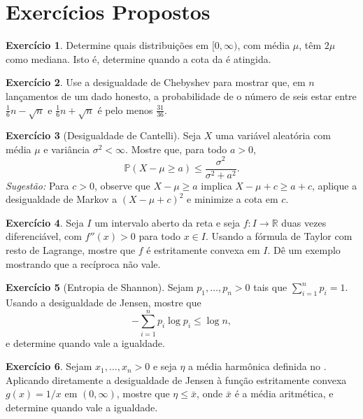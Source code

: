 \documentclass[12pt,portuguese]{article}
\theoremstyle{definition}
\theoremstyle{plainexercise}
\newtheorem{exercise}{Exercício}
\theoremstyle{starredexercise}
\newtheorem{starredexercise}[exercise]{Exercício}
\theoremstyle{definition}
\begin{document}
\section{Exercícios Propostos}\label{sec:exercicios}

\begin{exercise}\label{exercise:mediana-igualdade}
Determine quais distribuições em $[0,\infty)$, com média $\mu$, têm $2\mu$
como mediana. Isto é, determine quando a cota da
 é atingida.
\end{exercise}

\begin{exercise}\label{exercise:chebyshev-dado}
Use a desigualdade de Chebyshev para mostrar que, em $n$ lançamentos de um dado
honesto, a probabilidade de o número de seis estar entre
$\frac{1}{6}n-\sqrt n$ e $\frac{1}{6}n+\sqrt n$ é pelo menos $\frac{31}{36}$.
\end{exercise}

\begin{starredexercise}[Desigualdade de Cantelli]\label{exercise:chebyshev-forma}
Seja $X$ uma variável aleatória com média $\mu$ e variância $\sigma^2<\infty$.
Mostre que, para todo $a>0$,
\[
\mathbb{P}(X-\mu\geqslant a)\leqslant\frac{\sigma^2}{\sigma^2+a^2}.
\]
\emph{Sugestão:} Para $c>0$, observe que $X-\mu\geqslant a$ implica
$X-\mu+c\geqslant a+c$, aplique a desigualdade de Markov a $(X-\mu+c)^2$ e
minimize a cota em $c$.
\end{starredexercise}

\begin{exercise}\label{exercise:segunda-derivada}
Seja $I$ um intervalo aberto da reta e seja $f\colon I\to\mathbb{R}$ duas vezes
diferenciável, com $f''(x)>0$ para todo $x\in I$. Usando a fórmula de Taylor
com resto de Lagrange, mostre que $f$ é estritamente convexa em $I$. Dê um
exemplo mostrando que a recíproca não vale.
\end{exercise}

\begin{exercise}[Entropia de Shannon]\label{exercise:jensen-quadrado}
Sejam $p_1,\ldots,p_n>0$ tais que $\sum_{i=1}^{n}p_i=1$. Usando a desigualdade
de Jensen, mostre que
\[
-\sum_{i=1}^{n}p_i\log p_i\leqslant\log n,
\]
e determine quando vale a igualdade.
\end{exercise}

\begin{exercise}\label{exercise:media-harmonica}
Sejam $x_1,\ldots,x_n>0$ e seja $\eta$ a média harmônica definida no
. Aplicando diretamente a desigualdade de Jensen à
função estritamente convexa $g(x)=1/x$ em $(0,\infty)$, mostre que
$\eta\leqslant\bar{x}$, onde $\bar{x}$ é a média aritmética, e determine quando
vale a igualdade.
\end{exercise}
\end{document}
